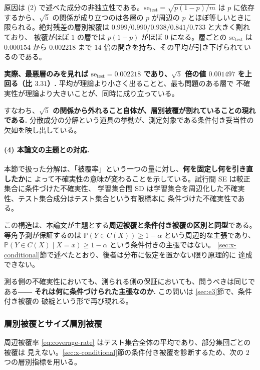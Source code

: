 \documentclass[a4paper,11pt]{jsarticle}
\theoremstyle{definition}
\theoremstyle{plain}
\theoremstyle{remark}
\newcommand{\Prob}{\mathbb{P}}
\begin{document}
原因は (2) で述べた成分の非独立性である。$\mathrm{se}_{\mathrm{test}}=\sqrt{p(1-p)/m}$ は
$p$ に依存するから、$\sqrt5$ の関係が成り立つのは各層の $p$ が周辺の $p$ とほぼ等しいときに
限られる。絶対残差の層別被覆は $0.999/0.990/0.938/0.841/0.733$ と大きく割れており、
被覆がほぼ $1$ の層では $p(1-p)$ がほぼ $0$ になる。層ごとの $\mathrm{se}_{\mathrm{test}}$ は
$0.000154$ から $0.002218$ まで $14$ 倍の開きを持ち、その平均が引き下げられているのである。

\textbf{実際、最悪層のみを見れば $\mathrm{se}_{\mathrm{test}}=0.002218$ であり、$\sqrt5$ 倍の値
$0.001497$ を上回る（比 $3.31$）.} 平均が理論より小さく出ることと、最も問題のある層で
不確実性が理論より大きいことが、同時に成り立っている。

すなわち、\textbf{$\sqrt5$ の関係から外れること自体が、層別被覆が割れていることの現れである.}
分散成分の分解という道具の挙動が、測定対象である条件付き妥当性の欠如を映し出している。

\paragraph{(4) 本論文の主題との対応.}
本節で扱った分解は、「被覆率」という一つの量に対し、\textbf{何を固定し何を引き直したか}に
よって不確実性の意味が変わることを示している。試行間 SE は較正集合に条件づけた不確実性、
学習集合間 SD は学習集合を周辺化した不確実性、テスト集合成分はテスト集合という有限標本に
条件づけた不確実性である。

この構造は、本論文が主題とする\textbf{周辺被覆と条件付き被覆の区別と同型}である。
等角予測が保証するのは $\Prob(Y\in C(X))\ge1-\alpha$ という周辺的な主張であり、
$\Prob(Y\in C(X)\mid X=x)\ge1-\alpha$ という条件付きの主張ではない。
\ref{sec:x-conditional}節で述べたとおり、後者は分布に仮定を置かない限り原理的に
達成できない。

測る側の不確実性においても、測られる側の保証においても、問うべきは同じである――
\textbf{それは何に条件づけられた主張なのか.} この問いは \ref{sec:e3}節で、条件付き被覆の
破綻という形で再び現れる。

\subsubsection{層別被覆とサイズ層別被覆}

周辺被覆率 \eqref{eq:coverage-rate} はテスト集合全体の平均であり、部分集団ごとの被覆は
見えない。\ref{sec:x-conditional}節の条件付き被覆を診断するため、次の $2$ つの層別指標を用いる。
\end{document}
